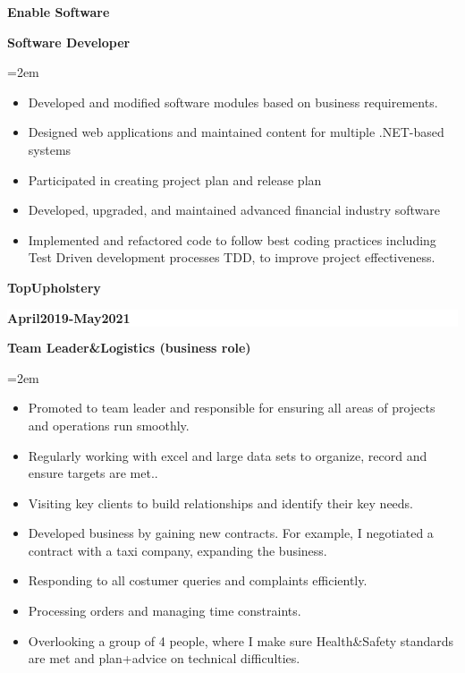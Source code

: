\documentclass[paper=a4,fontsize=12pt]{article} %
\newcommand{\sepspace}{\vspace*{1em}}
\newcommand{\NewPart}[1]{\section*{\text{#1}}}
\newcommand{\EducationEntry}[4]{
		\noindent \textbf{#1} \hfill      %
		\colorbox{White}{%
			\parbox{6em}{%
			\hfill\color{Black}#2}} \par  %
		\noindent \textbf{#3} \par        %
		\noindent\hangindent=2em\hangafter=0 \small #4 %
		\normalsize \par}
\begin{document}
\EducationEntry{Enable Software}{\textbf{\hspace{-2cm}{March2018-Jan2019}}}{Software Developer}{\begin{itemize}
		\itemsep-0.1em 
		\item Developed and modified software modules based on business requirements.
		\item Designed web applications and maintained content for multiple .NET-based systems
		\item Participated in creating project plan and release plan
		\item Developed, upgraded, and maintained advanced financial industry software
		\item  Implemented and refactored code to follow best coding practices including Test Driven development
processes TDD, to improve project effectiveness.
\end{itemize} }


\EducationEntry{TopUpholstery}{\textbf{\hspace{-2cm} April2019-May2021}}{Team Leader\&Logistics (business role)}{\begin{itemize}
		\itemsep-0.1em 
		\item Promoted to team leader and responsible for ensuring all areas of projects and operations run smoothly.
		\item Regularly working with excel and large data sets to organize, record and ensure targets are met..
		\item Visiting key clients to build relationships and identify their key needs.  	
		\item Developed business by gaining new contracts. For example, I negotiated a contract with a taxi company, expanding the business.  
		\item Responding to all costumer queries and complaints efficiently.
	    \item Processing orders and managing time constraints. 
		\item Overlooking a group of 4 people, where I make sure Health\&Safety standards are met and plan+advice on technical difficulties. 
	
	

	\end{itemize} 
}
\sepspace









\NewPart{Education}{}
\end{document}
